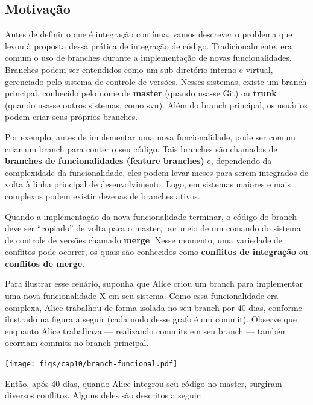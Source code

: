 \documentclass[
  11pt,
  twoside]{book}
\let\origfigure\figure
\let\endorigfigure\endfigure
\renewenvironment{figure}[1][2] {
    \expandafter\origfigure\expandafter[!h]
} {
    \endorigfigure
}
\begin{document}
\hypertarget{motivauxe7uxe3o}{%
\subsection{Motivação}\label{motivauxe7uxe3o}}

Antes de definir o que é integração contínua, vamos descrever o problema
que levou à proposta dessa prática de integração de código.
Tradicionalmente, era comum o uso de branches durante a implementação de
novas funcionalidades. Branches podem ser entendidos como um
sub-diretório interno e virtual, gerenciado pelo sistema de controle de
versões. Nesses sistemas, existe um branch principal, conhecido pelo
nome de \textbf{master} (quando usa-se Git) ou \textbf{trunk} (quando
usa-se outros sistemas, como svn). Além do branch principal, os usuários
podem criar seus próprios branches.

Por exemplo, antes de implementar uma nova funcionalidade, pode ser
comum criar um branch para conter o seu código. Tais branches são
chamados de \textbf{branches de funcionalidades (feature branches)} e,
dependendo da complexidade da funcionalidade, eles podem levar meses
para serem integrados de volta à linha principal de desenvolvimento.
Logo, em sistemas maiores e mais complexos podem existir dezenas de
branches ativos.

  Quando a
implementação da nova funcionalidade terminar, o código do branch deve
ser ``copiado'' de volta para o master, por meio de um comando do
sistema de controle de versões chamado \textbf{merge}. Nesse momento,
uma variedade de conflitos pode ocorrer, os quais são conhecidos como
\textbf{conflitos de integração} ou \textbf{conflitos de merge}.

Para ilustrar esse cenário, suponha que Alice criou um branch para
implementar uma nova funcionalidade X em seu sistema. Como essa
funcionalidade era complexa, Alice trabalhou de forma isolada no seu
branch por 40 dias, conforme ilustrado na figura a seguir (cada nodo
desse grafo é um commit). Observe que enquanto Alice trabalhava ---
realizando commits em seu branch --- também ocorriam commits no branch
principal.

\begin{figure}
\centering
\texttt{[image: figs/cap10/branch-funcional.pdf]}
\caption{Desenvolvimento usando branches de funcionalidades.}
\end{figure}

Então, após 40 dias, quando Alice integrou seu código no master,
surgiram diversos conflitos. Alguns deles são descritos a seguir:
\end{document}
